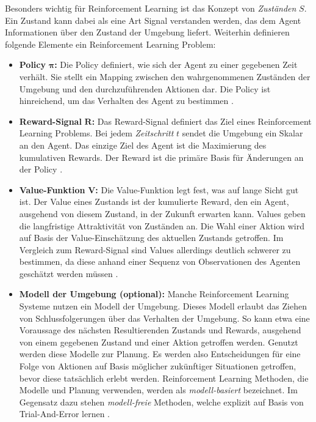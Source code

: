 Besonders wichtig für Reinforcement Learning ist das Konzept von \emph{Zuständen} $S$.
Ein Zustand kann dabei als eine Art Signal verstanden werden, das dem Agent Informationen über den Zustand der Umgebung liefert.
Weiterhin definieren folgende Elemente ein Reinforcement Learning Problem:
\begin{itemize}
    \item \textbf{Policy} $\mathbf{\pi}$\textbf{:}
    Die Policy definiert, wie sich der Agent zu einer gegebenen Zeit verhält.
    Sie stellt ein Mapping zwischen den wahrgenommenen Zuständen der Umgebung und den durchzuführenden Aktionen dar.
    Die Policy ist hinreichend, um das Verhalten des Agent zu bestimmen \cite[6]{sutton2018rlintro}.

    \item \textbf{Reward-Signal} $\mathbf{R}$\textbf{:}
    Das Reward-Signal definiert das Ziel eines Reinforcement Learning Problems.
    Bei jedem \emph{Zeitschritt} $t$ sendet die Umgebung ein Skalar an den Agent.
    Das einzige Ziel des Agent ist die Maximierung des kumulativen Rewards.
    Der Reward ist die primäre Basis für Änderungen an der Policy \cite[6]{sutton2018rlintro}.

    \item \textbf{Value-Funktion} $\mathbf{V}$\textbf{:}
    Die Value-Funktion legt fest, was auf lange Sicht gut ist.
    Der Value eines Zustands ist der kumulierte Reward, den ein Agent, ausgehend von diesem Zustand, in der Zukunft erwarten kann.
    Values geben die langfristige Attraktivität von Zuständen an.
    Die Wahl einer Aktion wird auf Basis der Value-Einschätzung des aktuellen Zustands getroffen.
    Im Vergleich zum Reward-Signal sind Values allerdings deutlich schwerer zu bestimmen, da diese anhand einer Sequenz von Observationen des Agenten geschätzt werden müssen \cite[6]{sutton2018rlintro}.

    \item \textbf{Modell der Umgebung (optional):}
    Manche Reinforcement Learning Systeme nutzen ein Modell der Umgebung.
    Dieses Modell erlaubt das Ziehen von Schlussfolgerungen über das Verhalten der Umgebung.
    So kann etwa eine Voraussage des nächsten Resultierenden Zustands und Rewards, ausgehend von einem gegebenen Zustand und einer Aktion getroffen werden.
    Genutzt werden diese Modelle zur Planung.
    Es werden also Entscheidungen für eine Folge von Aktionen auf Basis möglicher zukünftiger Situationen getroffen, bevor diese tatsächlich erlebt werden.
    Reinforcement Learning Methoden, die Modelle und Planung verwenden, werden als \emph{modell-basiert} bezeichnet.
Im Gegensatz dazu stehen \emph{modell-freie} Methoden, welche explizit auf Basis von Trial-And-Error lernen \cite[7]{sutton2018rlintro}.
\end{itemize}

